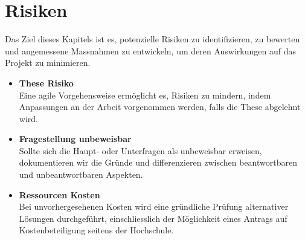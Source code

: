 
\section{Risiken}
Das Ziel dieses Kapitels ist es, potenzielle Risiken zu identifizieren, zu bewerten und angemessene Massnahmen zu entwickeln, um deren Auswirkungen auf das Projekt zu minimieren.

\begin{itemize}
    \item \textbf{These Risiko} \\
    Eine agile Vorgehensweise ermöglicht es, Risiken zu mindern, indem Anpassungen an der Arbeit vorgenommen werden, falls die These abgelehnt wird.

    \item \textbf{Fragestellung unbeweisbar} \\
    Sollte sich die Haupt- oder Unterfragen als unbeweisbar erweisen, dokumentieren wir die Gründe und differenzieren zwischen beantwortbaren und unbeantwortbaren Aspekten.

    \item \textbf{Ressourcen Kosten} \\
    Bei unvorhergesehenen Kosten wird eine gründliche Prüfung alternativer Lösungen durchgeführt, einschliesslich der Möglichkeit eines Antrags auf Kostenbeteiligung seitens der Hochschule.
    
\end{itemize}